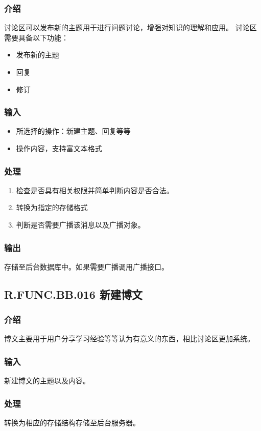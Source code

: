     \subsubsection{介绍}
    讨论区可以发布新的主题用于进行问题讨论，增强对知识的理解和应用。
    讨论区需要具备以下功能：
    \begin{itemize}
      \item 发布新的主题
      \item 回复
      \item 修订
    \end{itemize}
    \subsubsection{输入}
    \begin{itemize}
      \item 所选择的操作：新建主题、回复等等
      \item 操作内容，支持富文本格式
    \end{itemize}
    \subsubsection{处理}
    \begin{enumerate}
      \item 检查是否具有相关权限并简单判断内容是否合法。
      \item 转换为指定的存储格式
      \item 判断是否需要广播该消息以及广播对象。
    \end{enumerate}
    \subsubsection{输出}
    存储至后台数据库中。如果需要广播调用广播接口。

  \subsection{R.FUNC.BB.016 新建博文}
    \subsubsection{介绍}
    博文主要用于用户分享学习经验等等认为有意义的东西，相比讨论区更加系统。
    \subsubsection{输入}
    新建博文的主题以及内容。
    \subsubsection{处理}
    转换为相应的存储结构存储至后台服务器。

